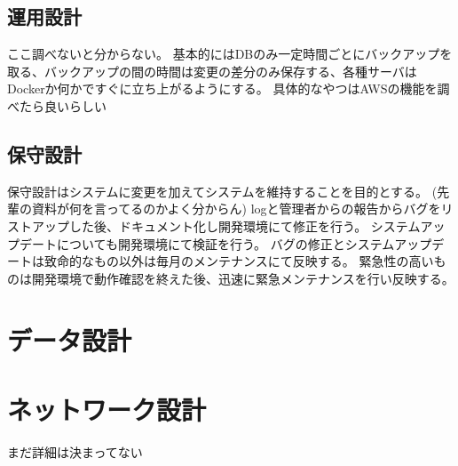 \documentclass[a4paper, titlepage]{jsarticle}
\begin{document}
\subsection{運用設計}
ここ調べないと分からない。
基本的にはDBのみ一定時間ごとにバックアップを取る、バックアップの間の時間は変更の差分のみ保存する、各種サーバはDockerか何かですぐに立ち上がるようにする。
具体的なやつはAWSの機能を調べたら良いらしい

\subsection{保守設計}
保守設計はシステムに変更を加えてシステムを維持することを目的とする。
(先輩の資料が何を言ってるのかよく分からん)
logと管理者からの報告からバグをリストアップした後、ドキュメント化し開発環境にて修正を行う。
システムアップデートについても開発環境にて検証を行う。
バグの修正とシステムアップデートは致命的なもの以外は毎月のメンテナンスにて反映する。
緊急性の高いものは開発環境で動作確認を終えた後、迅速に緊急メンテナンスを行い反映する。
\section{データ設計}

\section{ネットワーク設計}
まだ詳細は決まってない



\end{document}
